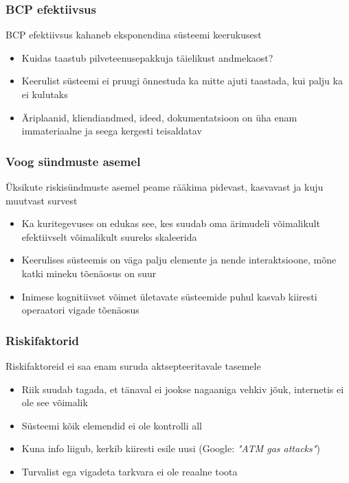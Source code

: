 \begin{frame}[fragile]
  \frametitle{BCP efektiivsus}
	BCP efektiivsus kahaneb eksponendina süsteemi keerukusest
	\begin{itemize}
		\item Kuidas taastub pilveteenusepakkuja täielikust andmekaost?
		\item Keerulist süsteemi ei pruugi õnnestuda ka mitte ajuti taastada, kui palju ka ei kulutaks
		\item Äriplaanid, kliendiandmed, ideed, dokumentatsioon on üha enam immateriaalne ja seega kergesti teisaldatav
	\end{itemize}
\end{frame}

\begin{frame}[fragile]
  \frametitle{Voog sündmuste asemel}
	Üksikute riskisündmuste asemel peame rääkima pidevast, kasvavast ja kuju muutvast survest
	\begin{itemize}
		\item Ka kuritegevuses on edukas see, kes suudab oma ärimudeli võimalikult efektiivselt võimalikult suureks skaleerida
		\item Keerulises süsteemis on väga palju elemente ja nende interaktsioone, mõne katki mineku tõenäosus on suur
		\item Inimese kognitiivset võimet ületavate süsteemide puhul kasvab kiiresti operaatori vigade tõenäosus
	\end{itemize}
\end{frame}

\begin{frame}[fragile]
  \frametitle{Riskifaktorid}
	Riskifaktoreid ei saa enam suruda aktsepteeritavale tasemele
	\begin{itemize}
		\item Riik suudab tagada, et tänaval ei jookse nagaaniga vehkiv jõuk, internetis ei ole see võimalik
		\item Süsteemi kõik elemendid ei ole kontrolli all
		\item Kuna info liigub, kerkib kiiresti esile uusi (Google: \emph{"ATM gas attacks"})
		\item Turvalist ega vigadeta tarkvara ei ole reaalne toota
	\end{itemize}
\end{frame}

